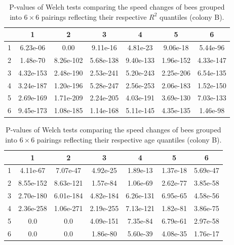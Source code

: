 \documentclass{article}
\begin{document}
\begin{table}[h!]
\centering
\def\tablename{Supplementary Table}
\caption{
P-values of Welch tests comparing the speed changes of bees grouped into $6 \times 6$ pairings reflecting their respective $R^2$ quantiles (colony B).
}
\begin{tabular}{|c|c|c|c|c|c|c|}
\hline
 & 1 & 2 & 3 & 4 & 5 & 6 \\ \hline
1 & 6.23e-06 & 0.00 & 9.11e-16 & 4.81e-23 & 9.06e-18 & 5.44e-96 \\ \hline
2 & 1.48e-70 & 8.26e-102 & 5.68e-138 & 9.40e-133 & 1.96e-152 & 4.33e-147 \\ \hline
3 & 4.32e-153 & 2.48e-190 & 2.53e-241 & 5.20e-243 & 2.25e-206 & 6.54e-135 \\ \hline
4 & 3.24e-187 & 1.20e-196 & 5.28e-247 & 2.56e-253 & 2.06e-183 & 1.52e-150 \\ \hline
5 & 2.69e-169 & 1.71e-209 & 2.24e-205 & 4.03e-191 & 3.69e-130 & 7.03e-133 \\ \hline
6 & 9.45e-173 & 1.08e-185 & 1.14e-168 & 5.11e-145 & 4.35e-135 & 1.46e-98 \\ \hline
\end{tabular}
\end{table}

\begin{table}[h!]
\centering
\def\tablename{Supplementary Table}
\caption{
P-values of Welch tests comparing the speed changes of bees grouped into $6 \times 6$ pairings reflecting their respective age quantiles (colony B).
}
\begin{tabular}{|c|c|c|c|c|c|c|}
\hline
 & 1 & 2 & 3 & 4 & 5 & 6 \\ \hline
1 & 4.11e-67 & 7.07e-47 & 4.92e-25 & 1.89e-13 & 1.37e-18 & 5.69e-47 \\ \hline
2 & 8.55e-152 & 8.63e-121 & 1.57e-84 & 1.06e-69 & 2.62e-77 & 3.85e-58 \\ \hline
3 & 2.70e-180 & 6.01e-184 & 4.82e-184 & 6.26e-131 & 6.95e-65 & 4.58e-56 \\ \hline
4 & 2.36e-258 & 1.06e-271 & 2.19e-255 & 7.13e-121 & 1.82e-81 & 3.86e-75 \\ \hline
5 & 0.0 & 0.0 & 4.09e-151 & 7.35e-84 & 6.79e-61 & 2.97e-58 \\ \hline
6 & 0.0 & 0.0 & 1.86e-80 & 5.60e-39 & 4.08e-35 & 1.76e-17 \\ \hline
\end{tabular}
\end{table}
\end{document}
